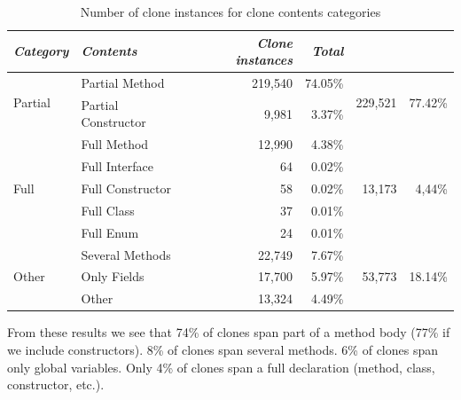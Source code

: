 \begin{table}[H]
\centering
\begin{tabular}{@{}llrrrr@{}}
\toprule
\textit{\textbf{Category}} & \textit{\textbf{Contents}} & \textit{\textbf{Clone instances}} & \textit{\textbf{Total}} \\ \midrule
\multirow{2}{*}{Partial} & Partial Method & 219,540 & 74.05\% & \multirow{2}{*}{229,521}& \multirow{2}{*}{77.42\%} \\ \cmidrule(lr){2-4}
 & Partial Constructor & 9,981 & 3.37\% & & \\ \midrule
\multirow{5}{*}{Full} & Full Method & 12,990 & 4.38\% & \multirow{5}{*}{13,173}& \multirow{5}{*}{4,44\%} \\ \cmidrule(lr){2-4}
 & Full Interface & 64 & 0.02\% & & \\ \cmidrule(lr){2-4}
 & Full Constructor & 58 & 0.02\% & & \\ \cmidrule(lr){2-4}
 & Full Class & 37 & 0.01\% & & \\ \cmidrule(lr){2-4}
 & Full Enum & 24 & 0.01\% & & \\ \midrule
\multirow{3}{*}{Other} & Several Methods & 22,749 & 7.67\% & \multirow{3}{*}{53,773} & \multirow{3}{*}{18.14\%} \\ \cmidrule(lr){2-4}
 & Only Fields & 17,700 & 5.97\% & & \\ \cmidrule(lr){2-4}
 & Other & 13,324 & 4.49\% & & \\ \bottomrule
\end{tabular}
\caption{Number of clone instances for clone contents categories}
\label{tab:contents}
\end{table}

From these results we see that 74\% of clones span part of a method body (77\% if we include constructors). 8\% of clones span several methods. 6\% of clones span only global variables. Only 4\% of clones span a full declaration (method, class, constructor, etc.).

